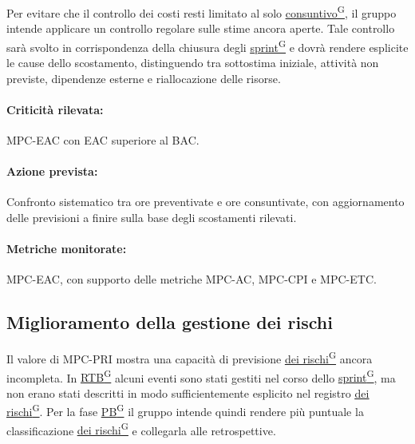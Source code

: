 \documentclass[a4paper,12pt]{article}
\providecommand{\glslink}[2]{\href{https://alittlebyte-19.github.io/Documentazione/glossario.html\#gls-#1}{\underline{#2}\textsuperscript{\scriptsize G}}}
\begin{document}
Per evitare che il controllo dei costi resti limitato al solo \glslink{consuntivo}{consuntivo}, il gruppo intende applicare un controllo regolare sulle stime ancora aperte. Tale controllo sarà svolto in corrispondenza della chiusura degli \glslink{sprint}{sprint} e dovrà rendere esplicite le cause dello scostamento, distinguendo tra sottostima iniziale, attività non previste, dipendenze esterne e riallocazione delle risorse.

\paragraph*{Criticità rilevata:} MPC-EAC con EAC superiore al BAC.

\paragraph*{Azione prevista:} Confronto sistematico tra ore preventivate e ore consuntivate, con aggiornamento delle previsioni a finire sulla base degli scostamenti rilevati.

\paragraph*{Metriche monitorate:} MPC-EAC, con supporto delle metriche MPC-AC, MPC-CPI e MPC-ETC.

\subsection{Miglioramento della gestione dei rischi}

Il valore di MPC-PRI mostra una capacità di previsione \glslink{mitigazione-dei-rischi}{dei rischi} ancora incompleta. In \glslink{rtb-requirements-and-technology-baseline}{RTB} alcuni eventi sono stati gestiti nel corso dello \glslink{sprint}{sprint}, ma non erano stati descritti in modo sufficientemente esplicito nel registro \glslink{mitigazione-dei-rischi}{dei rischi}. Per la fase \glslink{pb-product-baseline}{PB} il gruppo intende quindi rendere più puntuale la classificazione \glslink{mitigazione-dei-rischi}{dei rischi} e collegarla alle retrospettive.
\end{document}
